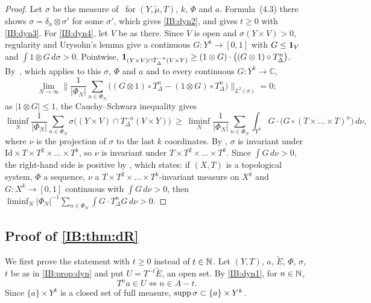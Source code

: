 \begin{proof}
Let $\sigma$ be the measure of~\cite[Definition~4.5]{kra2025density} for
$(Y,\tilde\mu,T)$, $k$, $\Phi$ and $a$. Formula~(4.3) there shows
$\sigma=\delta_a\otimes\sigma'$ for some $\sigma'$, which gives \ref{IB:dyn2}, and
\cite[Theorem~4.8]{kra2025density} gives $t\ge0$ with \ref{IB:dyn3}. For
\ref{IB:dyn4}, let $V$ be as there. Since $V$ is open and $\sigma(Y\times V)>0$,
regularity and Urysohn's lemma give a continuous $G\colon Y^k\to[0,1]$ with
$G\le\mathbf{1}_V$ and $\int 1\otimes G\,d\sigma>0$. Pointwise,
$\mathbf{1}_{(Y\times V)\cap T_\Delta^{-n}(V\times Y)}\ge(1\otimes G)\cdot\bigl((G\otimes1)\circ T_\Delta^n\bigr)$.
By~\cite[Theorem~6.2]{kra2025density}, which applies to this $\sigma$, $\Phi$ and $a$ and to every
continuous $G\colon Y^k\to\mathbb C$,
\[
\lim_{N\to\infty}\Big\|\frac1{|\Phi_N|}\sum_{n\in\Phi_N}\bigl((G\otimes1)\circ T_\Delta^n-(1\otimes G)\circ
T_\Delta^n\bigr)\Big\|_{L^2(\sigma)}=0;
\] as
$|1\otimes G|\le 1$, the Cauchy--Schwarz inequality gives
\[
\liminf_{N}\frac1{|\Phi_N|}\sum_{n\in\Phi_N}\sigma\bigl((Y\times V)\cap T_\Delta^{-n}(V\times Y)\bigr)
\ \ge\ \liminf_N\frac1{|\Phi_N|}\sum_{n\in\Phi_N}\int_{Y^k} G\cdot\bigl(G\circ(T\times\dots\times T)^n\bigr)\,d\nu ,
\]
where $\nu$ is the projection of $\sigma$ to the last $k$ coordinates. By
\cite[Lemma~4.7]{kra2025density}, $\sigma$ is invariant under
$\mathrm{Id}\times T\times T^2\times\dots\times T^k$, so $\nu$ is invariant under
$T\times T^2\times\dots\times T^k$. Since $\int G\,d\nu>0$, the right-hand side is positive by
\cite[Theorem~6.1]{kra2025density}, which states: if $(X,T)$ is a topological system, $\Phi$ a
\Fol{} sequence, $\nu$ a $T\times T^2\times\dots\times T^k$-invariant measure on $X^k$ and
$G\colon X^k\to[0,1]$ continuous with $\int G\,d\nu>0$, then
$\liminf_N|\Phi_N|^{-1}\sum_{n\in\Phi_N}\int G\cdot T_\Delta^nG\,d\nu>0$.
\end{proof}

\subsection{Proof of \texorpdfstring{\cref{IB:thm:dR}}{the theorem}}

We first prove the statement with $t\ge0$ instead of $t\in\mathbb{N}$. Let $(Y,T)$, $a$,
$\tilde E$, $\Phi$, $\sigma$, $t$ be as in \cref{IB:prop:dyn} and put
$U=T^{-t}\tilde E$, an open set. By \ref{IB:dyn1}, for $n\in\mathbb{N}$,
\begin{equation}\label{IB:eq:U}
T^na\in U\iff n\in A-t .
\end{equation}
Since $\{a\}\times Y^k$ is a closed set of full measure, $\operatorname{supp}\sigma\subset\{a\}\times Y^k$.

